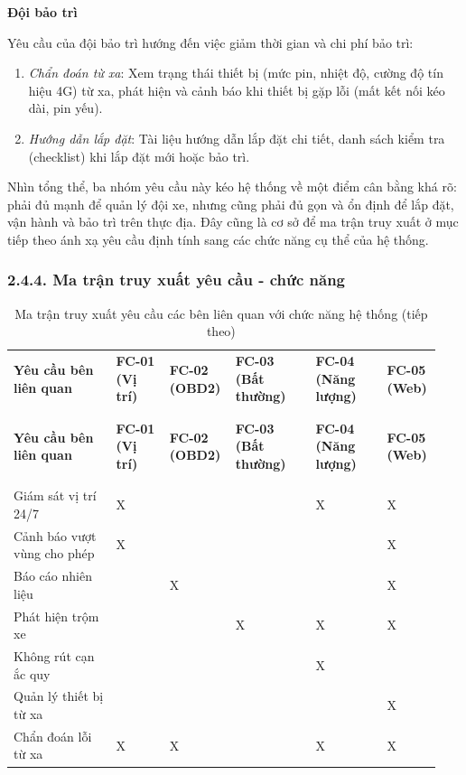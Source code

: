 \documentclass[a4paper]{extarticle}
\newcommand{\thesissettableid}[2]{%
  \renewcommand{\thetable}{#1}%
  \renewcommand{\theHtable}{#2}%
}
\providecommand{\tightlist}{%
  \setlength{\itemsep}{0pt}\setlength{\parskip}{0pt}}
\begin{document}
\textbf{Đội bảo trì}

Yêu cầu của đội bảo trì hướng đến việc giảm thời gian và chi phí bảo
trì:

\begin{enumerate}
\def\labelenumi{\arabic{enumi}.}
\tightlist
\item
  \emph{Chẩn đoán từ xa}: Xem trạng thái thiết bị (mức pin, nhiệt độ,
  cường độ tín hiệu 4G) từ xa, phát hiện và cảnh báo khi thiết bị gặp
  lỗi (mất kết nối kéo dài, pin yếu).
\item
  \emph{Hướng dẫn lắp đặt}: Tài liệu hướng dẫn lắp đặt chi tiết, danh
  sách kiểm tra (checklist) khi lắp đặt mới hoặc bảo trì.
\end{enumerate}

Nhìn tổng thể, ba nhóm yêu cầu này kéo hệ thống về một điểm cân bằng khá
rõ: phải đủ mạnh để quản lý đội xe, nhưng cũng phải đủ gọn và ổn định để
lắp đặt, vận hành và bảo trì trên thực địa. Đây cũng là cơ sở để ma trận
truy xuất ở mục tiếp theo ánh xạ yêu cầu định tính sang các chức năng cụ
thể của hệ thống.

\subsubsection{2.4.4. Ma trận truy xuất yêu cầu - chức
năng}\label{244-ma-trux1eadn-truy-xuux1ea5t-yuxeau-cux1ea7u---chux1ee9c-nux103ng}


{\thesissettableid{2.6}{tab-ch2-ma-tran-truy-xuat-yeu-cau-cac-ben-lien-quan-voi-chuc}
\def\LTcaptype{table}
\begin{longtable}{|L{0.237\linewidth}|L{0.122\linewidth}|L{0.122\linewidth}|L{0.186\linewidth}|L{0.168\linewidth}|L{0.101\linewidth}|}
\caption{Ma trận truy xuất yêu cầu các bên liên quan với chức năng hệ thống}\label{tab:ch2-ma-tran-truy-xuat-yeu-cau-cac-ben-lien-quan-voi-chuc}\\
\hline \textbf{Yêu cầu bên liên quan} & \textbf{FC-01 (Vị trí)} & \textbf{FC-02 (OBD2)} & \textbf{FC-03 (Bất
thường)} & \textbf{FC-04 (Năng lượng)} & \textbf{FC-05 (Web)} \\
\\\hline
\endfirsthead
\caption[]{Ma trận truy xuất yêu cầu các bên liên quan với chức năng hệ thống (tiếp theo)}\\
\hline \textbf{Yêu cầu bên liên quan} & \textbf{FC-01 (Vị trí)} & \textbf{FC-02 (OBD2)} & \textbf{FC-03 (Bất
thường)} & \textbf{FC-04 (Năng lượng)} & \textbf{FC-05 (Web)} \\
\\\hline
\endhead
\\\hline
\endfoot
\endlastfoot
Giám sát vị trí 24/7 & X & & & X & X \\\hline
Cảnh báo vượt vùng cho phép & X & & & & X \\\hline
Báo cáo nhiên liệu & & X & & & X \\\hline
Phát hiện trộm xe & & & X & X & X \\\hline
Không rút cạn ắc quy & & & & X & \\\hline
Quản lý thiết bị từ xa & & & & & X \\\hline
Chẩn đoán lỗi từ xa & X & X & & X & X \\\hline
\end{longtable}
}
\end{document}
